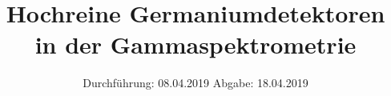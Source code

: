 

\subject{Versuch 18}
\title{Hochreine Germaniumdetektoren in der Gammaspektrometrie}
\date{%
  Durchführung: 08.04.2019
  \hspace{3em}
  Abgabe: 18.04.2019
}



\maketitle
\thispagestyle{empty}
\tableofcontents
\newpage






\printbibliography{}


